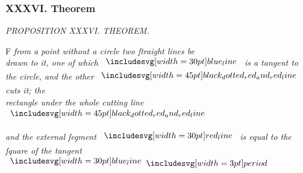 \documentclass[12pt,preview]{standalone}
\begin{document}
\subsubsection{XXXVI. Theorem}

\begin{minipage}[t]{0.64\textwidth}

    \begin{center}
        \textit{PROPOSITION XXXVI. THEOREM.}\label{book3pr36} \\
    \end{center}

    \hfill

    \begin{center}
        \raggedright \lettrine[lines=4, loversize=1, nindent=0pt]{}{}F \textit{from a point without a circle two ſtraight lines be\\ drawn to it, one of which } $\blueline$ \textit{is a tangent to\\ the circle, and the other} $\bimg{black_dotted_red_and_red_line}$ \textit{cuts it; the\\ rectangle under the whole cutting line} $\bimg{black_dotted_red_and_red_line}$
    \end{center}
    \raggedright \textit{and the external ſegment} $\redline$ \textit{is equal to the ſquare of the tangent} $\blueline \bperiod$
\end{minipage}%

\hfill
\end{document}
